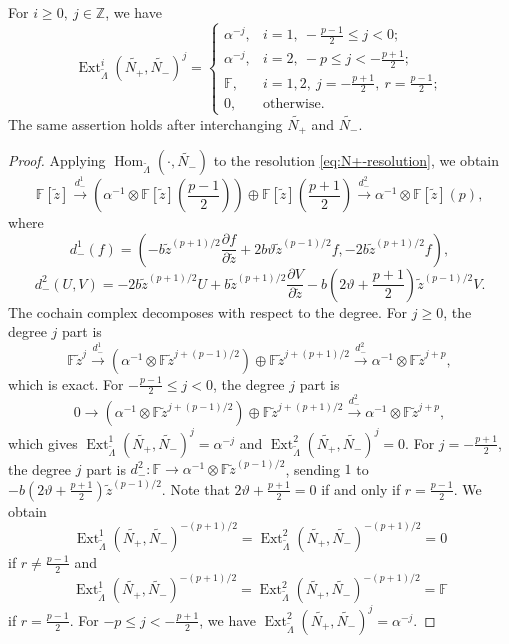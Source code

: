 \documentclass[11pt,a4paper]{article} %
\def\FF{\mathbb{F}}
\def\Ext{\operatorname{Ext}} %
\def\Hom{\operatorname{Hom}}
\begin{document}
\begin{lemma}\label{lem:mixed-N-Ext}
For $i\ge0,~j\in\mathbb{Z}$, we have
\[
\Ext_{\widetilde{\Lambda}}^i(\widetilde{N_+},\widetilde{N_-})^j=
         \begin{cases}
             \alpha^{-j},&i=1,~-\frac{p-1}{2}\le j<0;\\
             \alpha^{-j},&i=2,~-p\le j<-\frac{p+1}{2};\\
             \FF,&i=1,2,~j=-\frac{p+1}{2},~r=\frac{p-1}{2};\\
             0,&\text{otherwise}.            
         \end{cases}
\]
The same assertion holds after interchanging $\widetilde{N_+}$ and $\widetilde{N_-}$.
\end{lemma}

\begin{proof}
    Applying $\Hom_{\widetilde{\Lambda}}(\cdot,\widetilde{N_-})$ to the resolution \eqref{eq:N+-resolution}, we obtain
    \[
    \FF[\widetilde{z}]\xrightarrow{d^1_-}\left(\alpha^{-1}\otimes\FF[\widetilde{z}](\frac{p-1}{2})\right)\oplus\FF[\widetilde{z}](\frac{p+1}{2})\xrightarrow{d^2_-}\alpha^{-1}\otimes\FF[\widetilde{z}](p),
    \]
    where 
    \[
    d^1_-(f)=(-b\widetilde{z}^{(p+1)/2}\frac{\partial f}{\partial\widetilde{z}}+2b\vartheta\widetilde{z}^{(p-1)/2}f,-2b\widetilde{z}^{(p+1)/2}f),
    \]
    \[
    d^2_-(U,V)=-2b\widetilde{z}^{(p+1)/2}U+b\widetilde{z}^{(p+1)/2}\frac{\partial V}{\partial\widetilde{z}}-b(2\vartheta+\frac{p+1}{2})\widetilde{z}^{(p-1)/2}V.
    \]
    The cochain complex decomposes with respect to the degree. For $j\ge0$, the degree $j$ part is
    \[
    \FF\widetilde{z}^j\xrightarrow{d^1_-}(\alpha^{-1}\otimes\FF{\widetilde{
    z}}^{j+(p-1)/2})\oplus\FF{\widetilde{
    z}}^{j+(p+1)/2}\xrightarrow{d^2_-}\alpha^{-1}\otimes\FF{\widetilde{
    z}}^{j+p},
    \]
    which is exact. For $-\frac{p-1}{2}\le j<0$, the degree $j$ part is
    \[
    0\longrightarrow(\alpha^{-1}\otimes\FF{\widetilde{
    z}}^{j+(p-1)/2})\oplus\FF{\widetilde{
    z}}^{j+(p+1)/2}\xrightarrow{d^2_-}\alpha^{-1}\otimes\FF{\widetilde{
    z}}^{j+p},
    \]
    which gives $\Ext_{\widetilde{\Lambda}}^1(\widetilde{N_+},\widetilde{N_-})^j=\alpha^{-j}$ and $\Ext_{\widetilde{\Lambda}}^2(\widetilde{N_+},\widetilde{N_-})^j=0$. For $j=-\frac{p+1}{2}$, the degree $j$ part is $d^2_-:\FF\to\alpha^{-1}\otimes\FF{\widetilde{
    z}}^{(p-1)/2}$, sending $1$ to $-b(2\vartheta+\frac{p+1}{2})\widetilde{z}^{(p-1)/2}$. Note that $2\vartheta+\frac{p+1}{2}=0$ if and only if $r=\frac{p-1}{2}$. We obtain 
    \[
    \Ext_{\widetilde{\Lambda}}^1(\widetilde{N_+},\widetilde{N_-})^{-(p+1)/2}=\Ext_{\widetilde{\Lambda}}^2(\widetilde{N_+},\widetilde{N_-})^{-(p+1)/2}=0
    \]
    if $r\ne\frac{p-1}{2}$ and 
    \[
    \Ext_{\widetilde{\Lambda}}^1(\widetilde{N_+},\widetilde{N_-})^{-(p+1)/2}=\Ext_{\widetilde{\Lambda}}^2(\widetilde{N_+},\widetilde{N_-})^{-(p+1)/2}=\FF
    \]
    if $r=\frac{p-1}{2}$. For $-p\le j<-\frac{p+1}{2}$, we have $\Ext_{\widetilde{\Lambda}}^2(\widetilde{N_+},\widetilde{N_-})^j=\alpha^{-j}$.
\end{proof}
\end{document}
